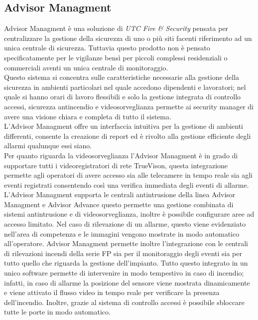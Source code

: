 \subsection{Advisor Managment}
Advisor Managment è una soluzione di \emph{UTC Fire \& Security} pensata per centralizzare la gestione della sicurezza di uno o più siti facenti riferimento ad un unica centrale di sicurezza. Tuttavia questo prodotto non è pensato specificatamente per le vigilanze bensì per piccoli complessi residenziali o commerciali aventi un unica centrale di monitoraggio.\\
Questo sistema si concentra sulle caratteristiche necessarie alla gestione della sicurezza in ambienti particolari nel quale accedono dipendenti e lavoratori; nel quale si hanno orari di lavoro flessibili e solo la gestione integrata di controllo accessi, sicurezza antincendio e videosorveglianza permette ai security manager di avere una visione chiara e completa di tutto il sistema.\\
L'Advisor Managment offre un interfaccia intuitiva per la gestione di ambienti differenti, consente la creazione di report ed è rivolto alla gestione efficiente degli allarmi qualunque essi siano.\\
Per quanto riguarda la videosorveglianza l'Advisor Managment è in grado di supportare tutti i videoregistratori di rete TrueVison, questa integrazione permette agli operatori di avere accesso sia alle telecamere in tempo reale sia agli eventi registrati consentendo così una verifica immediata degli eventi di allarme.\\ 
L'Advisor Managment supporta le centrali antintrusione della linea Advisor Managment e Advisor Advance questo permette una gestione combinata di sistemi antintrusione e di videosorveglianza, inoltre è possibile configurare aree ad accesso limitato. Nel caso di rilevazione di un allarme, questo viene evidenziato nell'area di competenza e le immagini vengono mostrate in modo automatico all'operatore. Advisor Managment permette inoltre l'integrazione con le centrali di rilevazioni incendi della serie FP sia per il monitoraggio degli eventi sia per tutto quello che riguarda la gestione dell'impianto. Tutto questo integrato in un unico software permette di intervenire in modo tempestivo in caso di incendio; infatti, in caso di allarme la posizione del sensore viene mostrata dinamicamente e viene attivato il flusso video in tempo reale per verificare la presenza dell'incendio. Inoltre, grazie al sistema di controllo accessi è possibile sbloccare tutte le porte in modo automatico.
